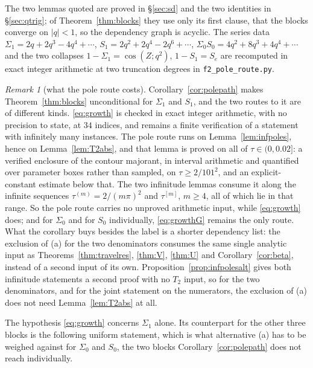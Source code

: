 \documentclass[11pt]{article}
\theoremstyle{plain}
\theoremstyle{definition}
\theoremstyle{remark}
\newtheorem{remark}[theorem]{Remark}
\begin{document}
\noindent The two lemmas quoted are proved in \S\ref{sec:sd} and the two identities in
\S\ref{sec:qtrig}; of Theorem~\ref{thm:blocks} they use only its first clause, that the blocks
converge on $|q|<1$, so the dependency graph is acyclic. The series data
$\Sigma_1=2q+2q^3-4q^4+\cdots$, $S_1=2q^2+2q^4-2q^6+\cdots$, $\Sigma_0S_0=4q^2+8q^3+4q^4+\cdots$
and the two collapses $1-\Sigma_1=\cos(Z;q^2)$, $1-S_1=S_e$ are recomputed in exact integer
arithmetic at two truncation degrees in \texttt{f2\_pole\_route.py}.

\begin{remark}[what the pole route costs]\label{rem:polepathcost}
Corollary~\ref{cor:polepath} makes Theorem~\ref{thm:blocks} unconditional for $\Sigma_1$ and $S_1$,
and the two routes to it are of different kinds. \eqref{eq:growth} is checked in exact integer
arithmetic, with no precision to state, at $34$ indices, and remains a finite verification of a
statement with infinitely many instances. The pole route runs on Lemma~\ref{lem:infpoles}, hence on
Lemma~\ref{lem:T2abs}, and that lemma is proved on all of $\tau\in(0,0.02]$: a verified enclosure
of the contour majorant, in interval arithmetic and quantified over parameter boxes rather than
sampled, on $\tau\ge2/101^2$, and an explicit-constant estimate below that. The two infinitude
lemmas consume it along the infinite sequences $\tau^{(m)}=2/(m\pi)^2$ and $\tau^{[m]}$, $m\ge4$,
all of which lie in that range. So the pole route carries no unproved arithmetic input, while
\eqref{eq:growth} does; and for $\Sigma_0$ and for $S_0$ individually, \eqref{eq:growthG} remains
the only route. What the corollary buys besides the label is a shorter dependency list: the
exclusion of \textup{(a)} for the two denominators consumes the same single analytic input as
Theorems~\ref{thm:travelres}, \ref{thm:V}, \ref{thm:U} and Corollary~\ref{cor:beta}, instead of a
second input of its own. Proposition~\ref{prop:infpolesalt} gives both infinitude statements a
second proof with no $T_2$ input, so for the two denominators, and for the joint statement on the
numerators, the exclusion of \textup{(a)} does not need Lemma~\ref{lem:T2abs} at all.
\end{remark}

\noindent The hypothesis \eqref{eq:growth} concerns $\Sigma_1$ alone. Its counterpart for the other
three blocks is the following uniform statement, which is what alternative \textup{(a)} has to be
weighed against for $\Sigma_0$ and $S_0$, the two blocks Corollary~\ref{cor:polepath} does not
reach individually.
\end{document}
